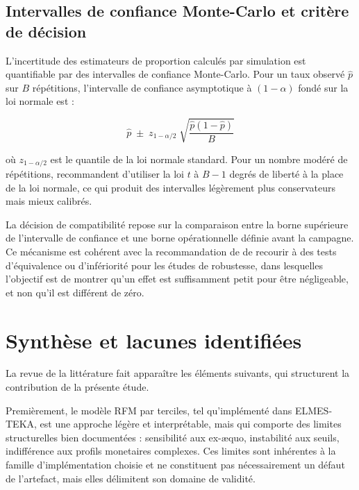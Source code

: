 \subsection{Intervalles de confiance Monte-Carlo et critère de décision}
\label{subsec:revue-simulation-ic}

L'incertitude des estimateurs de proportion calculés par simulation est quantifiable par
des intervalles de confiance Monte-Carlo. Pour un taux observé $\hat{p}$ sur $B$ répétitions,
l'intervalle de confiance asymptotique à $(1-\alpha)$ fondé sur la loi normale est :

\begin{equation}
  \hat{p} \;\pm\; z_{1-\alpha/2} \;\sqrt{\frac{\hat{p}(1-\hat{p})}{B}}
  \label{eq:ic-monte-carlo}
\end{equation}

\noindent où $z_{1-\alpha/2}$ est le quantile de la loi normale standard. Pour un nombre
modéré de répétitions, \citet{Morris2019} recommandent d'utiliser la loi $t$ à $B - 1$ degrés
de liberté à la place de la loi normale, ce qui produit des intervalles légèrement plus
conservateurs mais mieux calibrés.

La décision de compatibilité repose sur la comparaison entre la borne supérieure de
l'intervalle de confiance et une borne opérationnelle définie avant la campagne. Ce
mécanisme est cohérent avec la recommandation de \citet{Lakens2013} de recourir à des
tests d'équivalence ou d'infériorité pour les études de robustesse, dans lesquelles
l'objectif est de montrer qu'un effet est suffisamment petit pour être négligeable, et non
qu'il est différent de zéro.

\section{Synthèse et lacunes identifiées}
\label{sec:revue-synthese}

La revue de la littérature fait apparaître les éléments suivants, qui structurent la
contribution de la présente étude.

Premièrement, le modèle RFM par terciles, tel qu'implémenté dans ELMES-TEKA, est une
approche légère et interprétable, mais qui comporte des limites structurelles bien
documentées : sensibilité aux ex-æquo, instabilité aux seuils, indifférence aux profils
monetaires complexes. Ces limites sont inhérentes à la famille d'implémentation choisie
et ne constituent pas nécessairement un défaut de l'artefact, mais elles délimitent son
domaine de validité.


